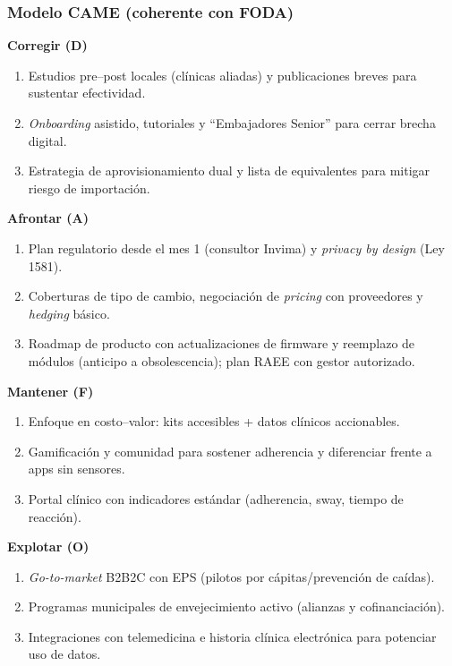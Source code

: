\subsubsection{Modelo CAME (coherente con FODA)}
\textbf{Corregir (D)} 
\begin{enumerate}
    \item Estudios pre--post locales (clínicas aliadas) y publicaciones breves para sustentar efectividad.
    \item \emph{Onboarding} asistido, tutoriales y “Embajadores Senior” para cerrar brecha digital.
    \item Estrategia de aprovisionamiento dual y lista de equivalentes para mitigar riesgo de importación.
\end{enumerate}

\textbf{Afrontar (A)}
\begin{enumerate}
    \item Plan regulatorio desde el mes 1 (consultor Invima) y \emph{privacy by design} (Ley 1581).
    \item Coberturas de tipo de cambio, negociación de \emph{pricing} con proveedores y \emph{hedging} básico.
    \item Roadmap de producto con actualizaciones de firmware y reemplazo de módulos (anticipo a obsolescencia); plan RAEE con gestor autorizado.
\end{enumerate}

\textbf{Mantener (F)}
\begin{enumerate}
    \item Enfoque en costo--valor: kits accesibles + datos clínicos accionables.
    \item Gamificación y comunidad para sostener adherencia y diferenciar frente a apps sin sensores.
    \item Portal clínico con indicadores estándar (adherencia, sway, tiempo de reacción).
\end{enumerate}

\textbf{Explotar (O)}
\begin{enumerate}
    \item \emph{Go-to-market} B2B2C con EPS (pilotos por cápitas/prevención de caídas).
    \item Programas municipales de envejecimiento activo (alianzas y cofinanciación).
    \item Integraciones con telemedicina e historia clínica electrónica para potenciar uso de datos.
\end{enumerate}
